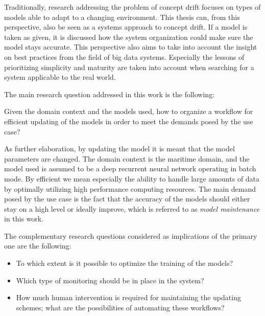 Traditionally, research addressing the problem of concept drift focuses on types of models able to adapt to a changing environment. This thesis can, from this perspective, also be seen as a systems approach to concept drift. If a model is taken as given, it is discussed how the system organization could make sure the model stays accurate. This perspective also aims to take into account the insight on best practices from the field of big data systems. Especially the lessons of prioritizing simplicity and maturity are taken into account when searching for a system applicable to the real world.




The main research question addressed in this work is the following:

\begin{center}
    Given the domain context and the models used, how to organize a workflow for efficient updating of the models in order to meet the demands posed by the use case?
\end{center}

As further elaboration, by updating the model it is meant that the model parameters are changed. The domain context is the maritime domain, and the model used is assumed to be a deep recurrent neural network operating in batch mode. By efficient we mean especially the ability to handle large amounts of data by optimally utilizing high performance computing resources. The main demand posed by the use case is the fact that the accuracy of the models should either stay on a high level or ideally improve, which is referred to as \textit{model maintenance} in this work.

The complementary research questions considered as implications of the primary one are the following:

\begin{itemize}
    \item To which extent is it possible to optimize the training of the models?
    \item Which type of monitoring should be in place in the system?
    \item How much human intervention is required for maintaining the updating schemes; what are the possibilities of automating these workflows?
\end{itemize}

